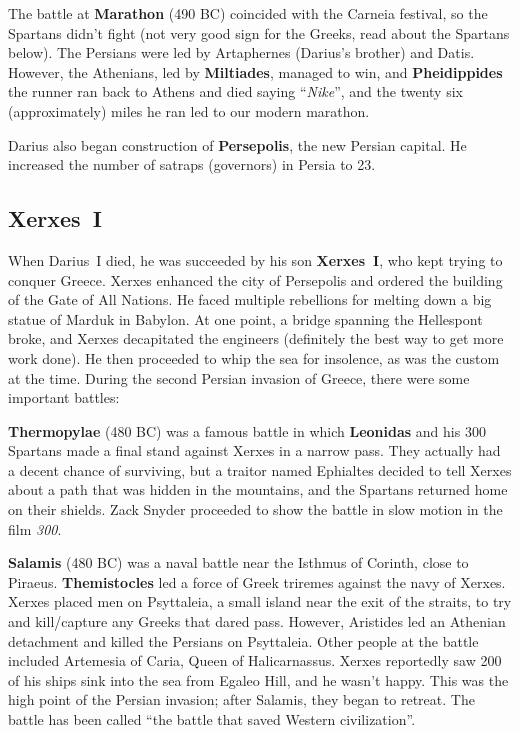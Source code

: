 The battle at \textbf{Marathon} (490 BC) coincided with the Carneia festival,
so the Spartans didn't fight (not very good sign for the Greeks, read about the Spartans below).
The Persians were led by Artaphernes (Darius's brother) and Datis.
However, the Athenians, led by \textbf{Miltiades}, managed to win,
and \textbf{Pheidippides} the runner ran back to Athens and died saying ``\textit{Nike}'',
and the twenty six (approximately) miles he ran led to our modern marathon.

Darius also began construction of \textbf{Persepolis}, the new Persian capital.
He increased the number of satraps (governors) in Persia to 23.

\subsection*{Xerxes~I}

When Darius~I died, he was succeeded by his son \textbf{Xerxes~I},
who kept trying to conquer Greece.
Xerxes enhanced the city of Persepolis and ordered the building of the Gate of All Nations.
He faced multiple rebellions for melting down a big statue of Marduk in Babylon.
At one point, a bridge spanning the Hellespont broke, and Xerxes decapitated the engineers
(definitely the best way to get more work done).
He then proceeded to whip the sea for insolence, as was the custom at the time.
During the second Persian invasion of Greece, there were some important battles:

\textbf{Thermopylae} (480 BC) was a famous battle in which \textbf{Leonidas} and his 300 Spartans
made a final stand against Xerxes in a narrow pass.
They actually had a decent chance of surviving,
but a traitor named Ephialtes decided to tell Xerxes about a path that
was hidden in the mountains, and the Spartans returned home on their shields.
Zack Snyder proceeded to show the battle in slow motion in the film \textit{300}.

\textbf{Salamis} (480 BC) was a naval battle near the Isthmus of Corinth, close to Piraeus.
\textbf{Themistocles} led a force of Greek triremes against the navy of Xerxes.
Xerxes placed men on Psyttaleia, a small island near the exit of the straits,
to try and kill/capture any Greeks that dared pass.
However, Aristides led an Athenian detachment and killed the Persians on Psyttaleia.
Other people at the battle included Artemesia of Caria, Queen of Halicarnassus.
Xerxes reportedly saw 200 of his ships sink into the sea from Egaleo Hill, and he wasn't happy.
This was the high point of the Persian invasion; after Salamis, they began to retreat.
The battle has been called ``the battle that saved Western civilization''.

